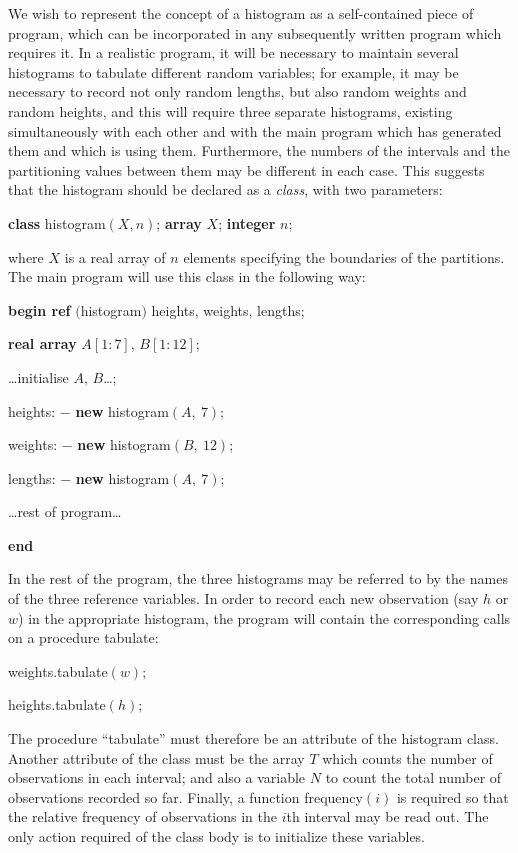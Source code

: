 \documentclass[twoside,11pt]{book}
\begin{document}
We wish to represent the concept of a histogram as a self-contained piece of program, which can be incorporated in any subsequently written program which requires it. In a realistic program, it will be necessary to maintain several histograms to tabulate different random variables; for example, it may be necessary to record not only random lengths, but also random weights and random heights, and this will require three separate histograms, existing simultaneously with each other and with the main program which has generated them and which is using them. Furthermore, the numbers of the intervals and the partitioning values between them may be different in each case. This suggests that the histogram should be declared as a \textit{class}, with two parameters:

\quad \textbf{class} histogram$(X, n)$; \textbf{array} $X$; \textbf{integer} $n$;

\noindent
where $X$ is a real array of $n$ elements specifying the boundaries of the partitions. The main program will use this class in the following way:

\quad \textbf{begin ref} $($histogram$)$ heights, weights, lengths;

\quad \quad \textbf{real array} $A[1:7]$, $B[1:12]$;

\quad \quad \dots initialise $A$, $B$\dots;

\quad \quad heights: $-$ \textbf{new} histogram$(A,\ 7)$;

\quad \quad weights: $-$ \textbf{new} histogram$(B,\ 12)$;

\quad \quad lengths: $-$ \textbf{new} histogram$(A,\ 7)$;

\quad \quad \dots rest of program\dots

\quad \textbf{end}

In the rest of the program, the three histograms may be referred to by the names of the three reference variables. In order to record each new observation (say $h$ or $w$) in the appropriate histogram, the program will contain the corresponding calls on a procedure tabulate:

\quad weights.tabulate$(w);$

\quad heights.tabulate$(h);$

\noindent
The procedure ``tabulate'' must therefore be an attribute of the histogram class. Another attribute of the class must be the array $T$ which counts the number of observations in each interval; and also a variable $N$ to count the total number of observations recorded so far. Finally, a function frequency$(i)$ is required so that the relative frequency of observations in the $i$th interval may be read out. The only action required of the class body is to initialize these variables.
\end{document}

